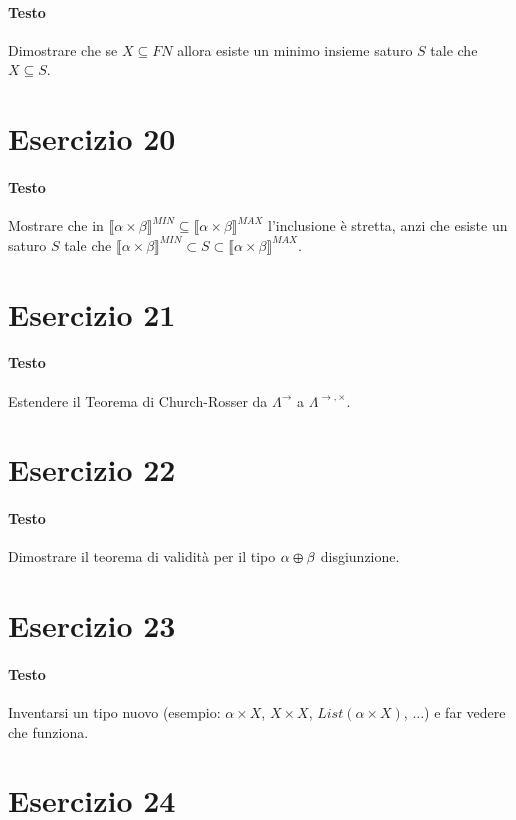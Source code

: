 \documentclass[a4paper,10pt]{article}
\begin{document}
\paragraph{Testo}
Dimostrare che se $X \subseteq F N$ allora esiste un minimo insieme saturo $S$ tale che $X \subseteq S$.

\section*{Esercizio 20}
\paragraph{Testo}
Mostrare che in $\llbracket \alpha \times \beta \rrbracket^{MIN} \subseteq \llbracket \alpha \times \beta \rrbracket^{MAX}$ l’inclusione è stretta, anzi che esiste un saturo $S$ tale che $\llbracket \alpha \times \beta \rrbracket^{MIN} \subset S \subset \llbracket \alpha \times \beta \rrbracket^{MAX}$.

\section*{Esercizio 21}
\paragraph{Testo}
Estendere il Teorema di Church-Rosser da $\Lambda^\rightarrow$ a $\Lambda^{\rightarrow, \times}$.

\section*{Esercizio 22}
\paragraph{Testo}
Dimostrare il teorema di validità per il tipo $\alpha \varoplus \beta$ disgiunzione.

\section*{Esercizio 23}
\paragraph{Testo}
Inventarsi un tipo nuovo (esempio: $\alpha \times X$, $X \times X$, $List(\alpha \times X)$, $\dots$) e far vedere che funziona.

\section*{Esercizio 24}
\end{document}
